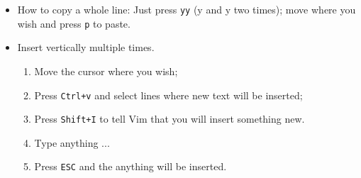 \documentclass[a4paper,14pt]{article}
\begin{document}
\begin{itemize}

	\item How to copy a whole line: Just press \texttt{yy} (y and y two times); move where you wish and press \texttt{p} to paste.

	\item  Insert vertically multiple times. \begin{enumerate}
		\item Move the cursor where you wish;
		\item Press \texttt{Ctrl+v} and select lines where new text will be inserted; 
		\item Press \texttt{Shift+I} to tell Vim that you will insert something new. 
		\item Type anything ... 
		\item Press \texttt{ESC} and the anything will be inserted.
		\end{enumerate}




\end{itemize}
\end{document}
